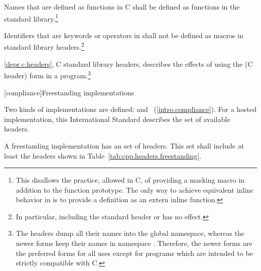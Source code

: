 \pnum
Names that are defined as functions in C shall be defined as functions in the
\Cpp standard library.\footnote{ This disallows the practice, allowed in C, of
providing a masking macro in addition to the function prototype. The only way to
achieve equivalent inline behavior in \Cpp is to provide a definition as an
extern inline function.}

\pnum
Identifiers that are keywords or operators in \Cpp shall not be defined as
macros in \Cpp standard library headers.\footnote{In particular, including the
standard header  or  has no effect.}

\pnum
\ref{depr.c.headers}, C standard library headers, describes the effects of using
the  (C header) form in a \Cpp program.\footnote{ The
 headers dump all their names into the global namespace, whereas the
newer forms keep their names in namespace . Therefore, the newer
forms are the preferred forms for all uses except for \Cpp programs which are
intended to be strictly compatible with C. }

[compliance]{Freestanding implementations}

\pnum
Two kinds of implementations are defined:
and
~(\ref{intro.compliance}).
For a hosted implementation, this International Standard
%
describes the set of available headers.

\pnum
A freestanding implementation has an
 set of headers. This set shall
include at least the headers shown in Table~\ref{tab:cpp.headers.freestanding}.

